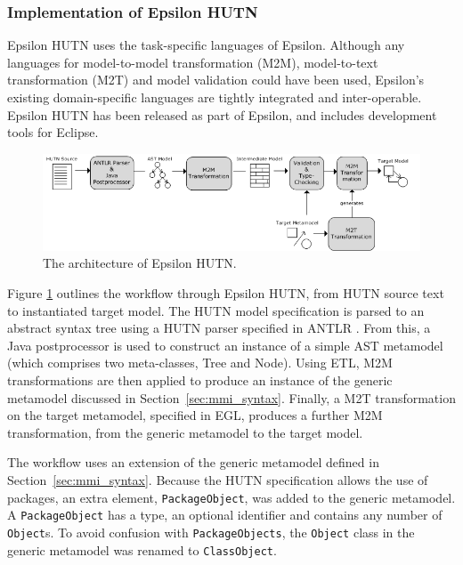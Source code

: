 \subsubsection{Implementation of Epsilon HUTN}
Epsilon HUTN uses the task-specific languages of Epsilon. Although any languages for model-to-model transformation 
(M2M), model-to-text transformation (M2T) and model validation could have been used, Epsilon's existing domain-specific languages are tightly integrated and inter-operable. Epsilon HUTN has been released as part of Epsilon, and includes development tools for Eclipse.

\begin{figure}[htbp]
  \begin{center}
    \leavevmode
    \includegraphics[scale=0.44]{5.Implementation/hutn_workflow.png}
  \end{center}
  \caption{The architecture of Epsilon HUTN.}
  \label{fig:architecture}
\end{figure}

Figure \ref{fig:architecture} outlines the workflow through Epsilon HUTN, from HUTN source text to instantiated target model. The HUTN model specification is parsed to an abstract syntax tree using a HUTN parser specified in ANTLR \cite{parr07antlr}. From this, a Java postprocessor is used to construct an instance of a simple AST metamodel (which comprises two meta-classes, Tree and Node). Using ETL, M2M transformations are then applied to produce an instance of the generic metamodel discussed in Section~\ref{sec:mmi_syntax}. Finally, a M2T transformation on the target metamodel, specified in EGL, produces a further M2M transformation, from the generic metamodel to the target model.

The workflow uses an extension of the generic metamodel defined in Section~\ref{sec:mmi_syntax}. Because the HUTN specification allows the use of packages, an extra element, \texttt{PackageObject}, was added to the generic metamodel. A \texttt{PackageObject} has a type, an optional identifier and contains any number of \texttt{Object}s. To avoid confusion with \texttt{PackageObjects}, the \texttt{Object} class in the generic metamodel was renamed to \texttt{ClassObject}.

